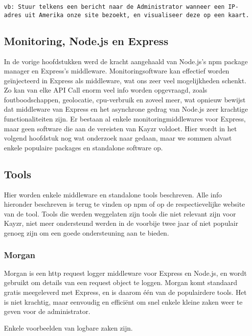 \texttt{vb: Stuur telkens een bericht naar de Administrator wanneer een IP-adres uit Amerika onze site bezoekt, en visualiseer deze op een kaart.}

\subsection{Monitoring, Node.js en Express}
\label{sec:monitoringNodeExpress}

In de vorige hoofdstukken werd de kracht aangehaald van Node.js's npm package manager en Express's middleware. Monitoringsoftware kan effectief worden geïnjecteerd in Express als middleware, wat ons zeer veel mogelijkheden schenkt. Zo kan van elke API Call enorm veel info worden opgevraagd, zoals foutboodschappen, geolocatie, cpu-verbruik en zoveel meer, wat opnieuw bewijst dat middleware van Express en het asynchrone gedrag van Node.js zeer krachtige functionaliteiten zijn. Er bestaan al enkele monitoringmiddlewares voor Express, maar geen software die aan de vereisten van Kayzr voldoet. Hier wordt in het volgend hoofdstuk nog wat onderzoek naar gedaan, maar we sommen alvast enkele populaire packages en standalone software op.

\subsection{Tools}
\label{sec:tools}

Hier worden enkele middleware en standalone tools beschreven. Alle info hieronder beschreven is terug te vinden op npm of op de respectievelijke website van de tool. Tools die werden weggelaten zijn tools die niet relevant zijn voor Kayzr, niet meer ondersteund werden in de voorbije twee jaar of niet populair genoeg zijn om een goede ondersteuning aan te bieden. 

\subsubsection{Morgan}
\label{sec:morgan}

Morgan is een http request logger middleware voor Express en Node.js, en wordt gebruikt om details van een request object te loggen. Morgan komt standaard gratis meegeleverd met Express, en is daarom één van de populairdere tools. Het is niet krachtig, maar eenvoudig en efficiënt om snel enkele kleine zaken weer te geven voor de administrator.

Enkele voorbeelden van logbare zaken zijn.

